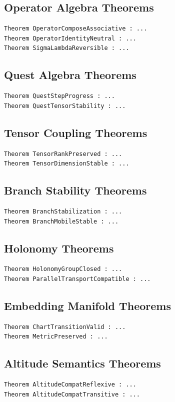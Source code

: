 \documentclass[11pt]{article}
\begin{document}
\subsection{Operator Algebra Theorems}
\begin{verbatim}
Theorem OperatorComposeAssociative : ...
Theorem OperatorIdentityNeutral : ...
Theorem SigmaLambdaReversible : ...
\end{verbatim}

\subsection{Quest Algebra Theorems}
\begin{verbatim}
Theorem QuestStepProgress : ...
Theorem QuestTensorStability : ...
\end{verbatim}

\subsection{Tensor Coupling Theorems}
\begin{verbatim}
Theorem TensorRankPreserved : ...
Theorem TensorDimensionStable : ...
\end{verbatim}

\subsection{Branch Stability Theorems}
\begin{verbatim}
Theorem BranchStabilization : ...
Theorem BranchMobileStable : ...
\end{verbatim}

\subsection{Holonomy Theorems}
\begin{verbatim}
Theorem HolonomyGroupClosed : ...
Theorem ParallelTransportCompatible : ...
\end{verbatim}

\subsection{Embedding Manifold Theorems}
\begin{verbatim}
Theorem ChartTransitionValid : ...
Theorem MetricPreserved : ...
\end{verbatim}

\subsection{Altitude Semantics Theorems}
\begin{verbatim}
Theorem AltitudeCompatReflexive : ...
Theorem AltitudeCompatTransitive : ...
\end{verbatim}
\end{document}
